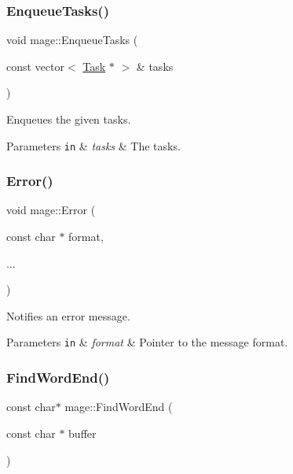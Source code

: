 \subsubsection{\texorpdfstring{Enqueue\+Tasks()}{EnqueueTasks()}}
{\footnotesize\ttfamily void mage\+::\+Enqueue\+Tasks (\begin{DoxyParamCaption}\item[{const vector$<$ \hyperlink{classmage_1_1_task}{Task} $\ast$ $>$ \&}]{tasks }\end{DoxyParamCaption})}

Enqueues the given tasks.


\begin{DoxyParams}[1]{Parameters}
\mbox{\tt in}  & {\em tasks} & The tasks. \\
\hline
\end{DoxyParams}
\hypertarget{namespacemage_a52a7fe8c9ce39afd9e0b0299373db0fa}{}\label{namespacemage_a52a7fe8c9ce39afd9e0b0299373db0fa} 
\subsubsection{\texorpdfstring{Error()}{Error()}}
{\footnotesize\ttfamily void mage\+::\+Error (\begin{DoxyParamCaption}\item[{const char $\ast$}]{format,  }\item[{}]{... }\end{DoxyParamCaption})}

Notifies an error message.


\begin{DoxyParams}[1]{Parameters}
\mbox{\tt in}  & {\em format} & Pointer to the message format. \\
\hline
\end{DoxyParams}
\hypertarget{namespacemage_ab2e62d950dc620167f4128cb16033998}{}\label{namespacemage_ab2e62d950dc620167f4128cb16033998} 
\subsubsection{\texorpdfstring{Find\+Word\+End()}{FindWordEnd()}}
{\footnotesize\ttfamily const char$\ast$ mage\+::\+Find\+Word\+End (\begin{DoxyParamCaption}\item[{const char $\ast$}]{buffer }\end{DoxyParamCaption})}


